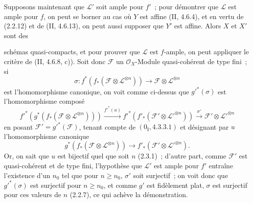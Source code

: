 Supposons maintenant que $\mathcal L'$ soit ample pour $f'$~; pour démontrer
que $\mathcal L$ est ample pour $f$, on peut se borner au cas où $Y$ est
affine (II, 4.6.4), et en vertu de (2.2.12) et de (II, 4.6.13), on peut aussi
supposer que $Y'$ est affine. Alors $X$ et $X'$ sont des

schémas quasi-compacts, et pour prouver que $\mathcal L$ est $f$-ample, on
peut appliquer le critère de (II, 4.6.8, c)). Soit donc $\mathcal F$ un
$\mathcal O_X$-Module quasi-cohérent de type fini~; si
\[
\sigma:f^*(f_*(\mathcal F\otimes\mathcal L^{\otimes n}))
\longrightarrow\mathcal F\otimes\mathcal L^{\otimes n}
\]
est l'homomorphisme canonique, on voit comme ci-dessus que $g'^*(\sigma)$ est
l'homomorphisme composé
\[
f'^*(g^*(f_*(\mathcal F\otimes\mathcal L^{\otimes n})))
\xrightarrow{f'^*(u)}f'^*(f'_*(\mathcal F'\otimes
\mathcal L'^{\otimes n}))\xrightarrow{\sigma'}
\mathcal F'\otimes\mathcal L'^{\otimes n}
\]
en posant $\mathcal F'=g'^*(\mathcal F)$, tenant compte de
$(0_{\mathrm I},4.3.3.1)$ et désignant par $u$ l'homomorphisme canonique
\[
g^*(f_*(\mathcal F\otimes\mathcal L^{\otimes n}))
\longrightarrow f'_*(\mathcal F'\otimes\mathcal L'^{\otimes n}).
\]
Or, on sait que $u$ est bijectif quel que soit $n$ (2.3.1)~; d'autre part,
comme $\mathcal F'$ est quasi-cohérent et de type fini, l'hypothèse que
$\mathcal L'$ est ample pour $f'$ entraîne l'existence d'un $n_0$ tel que
pour $n\geq n_0$, $\sigma'$ soit surjectif~; on voit donc que
$g'^*(\sigma)$ est surjectif pour $n\geq n_0$, et comme $g'$ est fidèlement
plat, $\sigma$ est surjectif pour ces valeurs de $n$ (2.2.7), ce qui achève
la démonstration.

